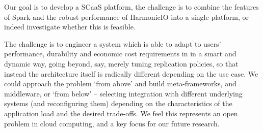 \documentclass[conference]{IEEEtran}
\begin{document}

Our goal is to develop a SCaaS platform, %
the challenge is to combine the features of Spark and the robust performance of HarmonicIO into a single platform, or indeed investigate whether this is feasible. 


The challenge is to engineer a system which is able to adapt to users' performance, durability and economic cost requirements in in a smart and dynamic way, going beyond, say, merely tuning replication policies, so that instead the architecture itself is radically different depending on the use case. We could approach the problem `from above' and build meta-frameworks, and middleware,
or `from below' -- selecting integration with different underlying systems (and reconfiguring them) depending on the characteristics of the application load and the desired trade-offs. %
We feel this represents an open problem in cloud computing, and a key focus for our future research.






% 
% 


{
}
\end{document}
